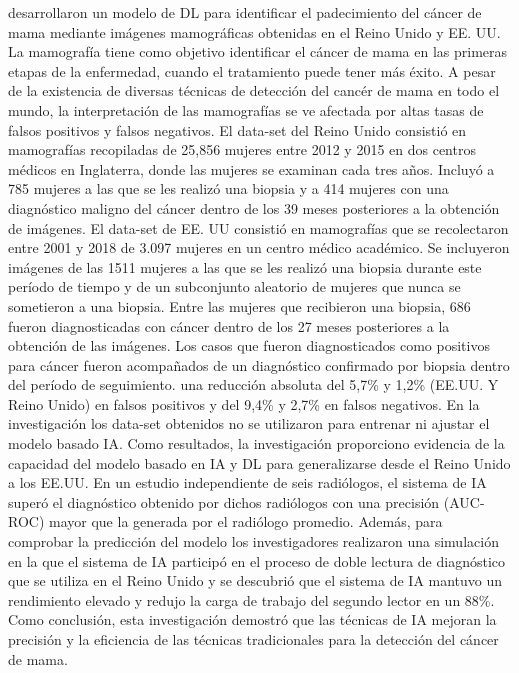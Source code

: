 \cite{McKinney2020} desarrollaron un modelo de DL para identificar el padecimiento del cáncer de mama mediante imágenes mamográficas obtenidas en el Reino Unido y EE. UU. La mamografía tiene como objetivo identificar el cáncer de mama en las primeras etapas de la enfermedad, cuando el tratamiento puede tener más éxito. A pesar de la existencia de diversas técnicas de detección del cancér de mama en todo el mundo, la interpretación de las mamografías se ve afectada por altas tasas de falsos positivos y falsos negativos. El data-set del Reino Unido consistió en mamografías recopiladas de 25,856 mujeres entre 2012 y 2015 en dos centros médicos en Inglaterra, donde las mujeres se examinan cada tres años. Incluyó a 785 mujeres a las que se les realizó una biopsia y a 414 mujeres con una diagnóstico maligno del cáncer dentro de los 39 meses posteriores a la obtención de imágenes. El data-set de EE. UU consistió en mamografías que se recolectaron entre 2001 y 2018 de 3.097 mujeres en un centro médico académico. Se incluyeron imágenes de las 1511 mujeres a las que se les realizó una biopsia durante este período de tiempo y de un subconjunto aleatorio de mujeres que nunca se sometieron a una biopsia. Entre las mujeres que recibieron una biopsia, 686 fueron diagnosticadas con cáncer dentro de los 27 meses posteriores a la obtención de las imágenes. Los casos que fueron diagnosticados como positivos para cáncer fueron acompañados de un diagnóstico confirmado por biopsia dentro del período de seguimiento. una reducción absoluta del 5,7\% y 1,2\% (EE.UU. Y Reino Unido) en falsos positivos y del 9,4\% y 2,7\% en falsos negativos. En la investigación los data-set obtenidos no se utilizaron para entrenar ni ajustar el modelo basado IA. Como resultados, la investigación proporciono evidencia de la capacidad del modelo basado en IA y DL para generalizarse desde el Reino Unido a los EE.UU. En un estudio independiente de seis radiólogos, el sistema de IA superó el diagnóstico obtenido por dichos radiólogos con una precisión (AUC-ROC) mayor que la generada por el radiólogo promedio. Además, para comprobar la predicción del modelo los investigadores realizaron una simulación en la que el sistema de IA participó en el proceso de doble lectura de diagnóstico que se utiliza en el Reino Unido y se descubrió que el sistema de IA mantuvo un rendimiento elevado y redujo la carga de trabajo del segundo lector en un 88\%. Como conclusión, esta investigación demostró que las técnicas de IA mejoran la precisión y la eficiencia de las técnicas tradicionales para la detección del cáncer de mama.


